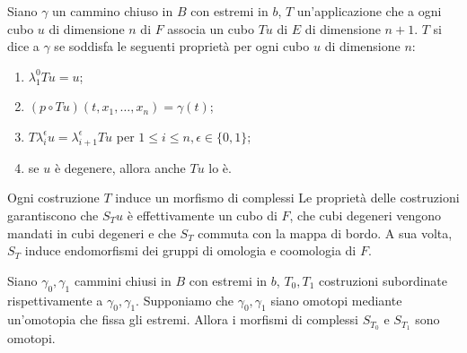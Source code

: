 \begin{definition}
Siano \(\gamma\) un cammino chiuso in \(B\) con estremi in \(b\), \(T\) un'applicazione che a ogni cubo \(u\) di dimensione \(n\) di \(F\) associa un cubo \(Tu\) di \(E\) di dimensione \(n+1\). \(T\) si dice  a \(\gamma\) se soddisfa le seguenti proprietà per ogni cubo \(u\) di dimensione \(n\):
\begin{enumerate}
\item \(\lambda^0_1 Tu=u\);
\item \((p\circ Tu)(t,x_1,\ldots,x_n)=\gamma(t)\);
\item \(T\lambda^\epsilon_iu=\lambda^\epsilon_{i+1}Tu\) per \(1\le i\le n,\epsilon\in\{0,1\}\);
\item se \(u\) è degenere, allora anche \(Tu\) lo è.
\end{enumerate}
\end{definition}
Ogni costruzione \(T\) induce un morfismo di complessi
Le proprietà delle costruzioni garantiscono che \(S_Tu\) è effettivamente un cubo di \(F\), che cubi degeneri vengono mandati in cubi degeneri e che \(S_T\) commuta con la mappa di bordo. A sua volta, \(S_T\) induce endomorfismi dei gruppi di omologia e coomologia di \(F\).
\begin{proposition}
Siano \(\gamma_0,\gamma_1\) cammini chiusi in \(B\) con estremi in \(b\), \(T_0,T_1\) costruzioni subordinate rispettivamente a \(\gamma_0,\gamma_1\). Supponiamo che \(\gamma_0,\gamma_1\) siano omotopi mediante un'omotopia che fissa gli estremi. Allora i morfismi di complessi \(S_{T_0}\) e \(S_{T_1}\) sono omotopi.
\end{proposition}

